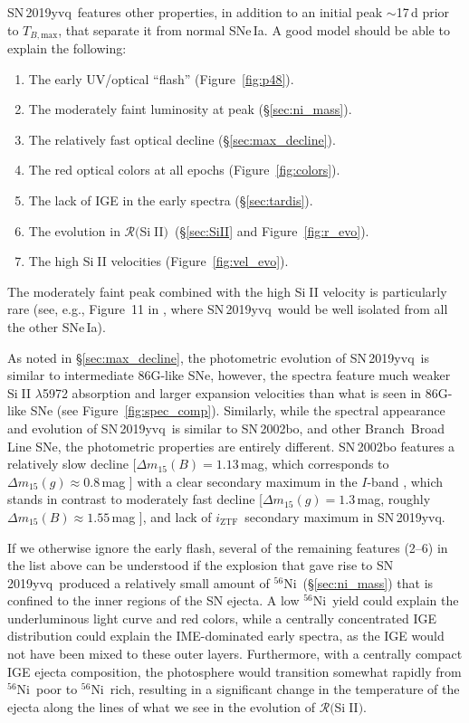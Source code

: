 \documentclass[twocolumn]{aastex63}
\def\ion#1#2{#1$\;${\footnotesize\rm{#2}}\relax}
\newcommand{\todo}[1]{{\color{magenta} to-do: {#1}}}
\newcommand{\iztf}{$i_\mathrm{ZTF}$}
\newcommand{\tbmax}{$T_{B,\mathrm{max}}$}
\newcommand{\RSiII}{$\mathcal{R}($\ion{Si}{II}$)$}
\newcommand{\radni}{$^{56}$Ni}
\newcommand{\sn}{SN\,2019yvq}
\begin{document}
\sn\ features other properties, in addition to an initial peak $\sim$17\,d
prior to \tbmax, that separate it from normal SNe\,Ia. A good model should be
able to explain the following:
%
\begin{enumerate}
    \item The early UV/optical ``flash'' (Figure~\ref{fig:p48}).
    \item The moderately faint luminosity at peak  (\S\ref{sec:ni_mass}). 
    \item The relatively fast optical decline (\S\ref{sec:max_decline}). 
    \item The red optical colors at all epochs (Figure~\ref{fig:colors}). 
    \item The lack of IGE in the early spectra (\S\ref{sec:tardis}).
    \item The evolution in \RSiII\ (\S\ref{sec:SiII} and Figure~\ref{fig:r_evo}).
    \item The high \ion{Si}{II} velocities (Figure~\ref{fig:vel_evo}).
\end{enumerate}
%
The moderately faint peak combined with the high \ion{Si}{II} velocity is
particularly rare (see, e.g., Figure~11 in \citealt{Polin19}, where \sn\ would
be well isolated from all the other SNe\,Ia).

As noted in \S\ref{sec:max_decline}, the photometric evolution of \sn\ is
similar to intermediate 86G-like SNe, however, the spectra feature much weaker
\ion{Si}{II} $\lambda$5972 absorption and larger expansion velocities than
what is seen in 86G-like SNe (see Figure~\ref{fig:spec_comp}). Similarly,
while the spectral appearance and evolution of \sn\ is similar to SN\,2002bo,
and other Branch~Broad Line SNe, the photometric properties are entirely
different. SN\,2002bo features a relatively slow decline [$\Delta{m}_{15}(B) =
1.13$\,mag, which corresponds to $\Delta{m}_{15}(g) \approx 0.8$\,mag
\citep[see, e.g., Figure~2 in][]{Folatelli10}] with a clear secondary maximum
in the $I$-band \citep{Benetti04}, which stands in contrast to moderately fast
decline [$\Delta{m}_{15}(g) = 1.3$\,mag, roughly $\Delta{m}_{15}(B) \approx
1.55$\,mag \citep{Folatelli10}], and lack of \iztf\ secondary maximum in \sn.

If we otherwise ignore the early flash, several of the remaining features
(2--6) in the list above can be understood if the explosion that gave rise to
\sn\ produced a relatively small amount of \radni\ (\S\ref{sec:ni_mass}) that
is confined to the inner regions of the SN ejecta. A low \radni\ yield could
explain the underluminous light curve and red colors, while a centrally
concentrated IGE distribution could explain the IME-dominated early spectra,
as the IGE would not have been mixed to these outer layers. Furthermore, with
a centrally compact IGE ejecta composition, the photosphere would transition
somewhat rapidly from \radni\ poor to \radni\ rich, resulting in a significant
change in the temperature of the ejecta along the lines of what we see in the
evolution of \RSiII.
\end{document}
